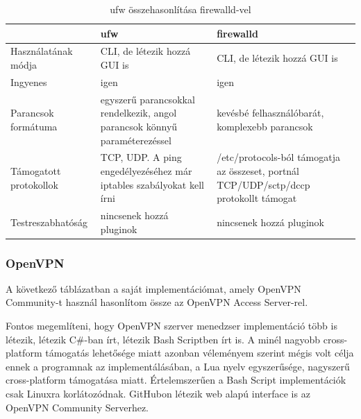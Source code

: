 \begin{table}[h]
\centering
\caption{ufw összehasonlítása firewalld-vel}
\label{tab:ispconfig}
\begin{tabularx}{\linewidth}{l|L|L}
 & ufw & firewalld \\
\hline
Használatának módja & CLI, de létezik hozzá GUI is & CLI, de létezik hozzá GUI is \\
\hline
Ingyenes & igen & igen \\
\hline
Parancsok formátuma & egyszerű parancsokkal rendelkezik, angol parancsok könnyű paraméterezéssel \cite{ufw} & kevésbé felhasználóbarát, komplexebb parancsok \cite{firewalld_man}\\
\hline
Támogatott protokollok & TCP, UDP. A ping engedélyezéséhez már iptables szabályokat kell írni & /etc/protocols-ból támogatja az összeset, portnál TCP/UDP/sctp/dccp protokollt támogat \\
\hline
Testreszabhatóság & nincsenek hozzá pluginok & nincsenek hozzá pluginok \\
\end{tabularx}
\end{table}
\subsubsection{OpenVPN}
A következő táblázatban a saját implementációmat, amely OpenVPN Community-t használ hasonlítom össze az OpenVPN Access Server-rel.

Fontos megemlíteni, hogy OpenVPN szerver menedzser implementáció több is létezik, létezik C\#-ban írt, létezik Bash Scriptben írt is. A minél nagyobb cross-platform támogatás lehetősége miatt azonban véleményem szerint mégis volt célja ennek a programnak az implementálásában, a Lua nyelv egyszerűsége, nagyszerű cross-platform támogatása miatt. Értelemszerűen a Bash Script implementációk csak Linuxra korlátozódnak. GitHubon létezik web alapú interface is az OpenVPN Community Serverhez.

